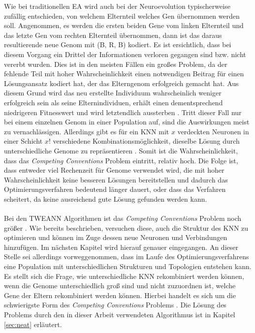 Wie bei traditionellen \ac{EA} wird auch bei der Neuroevolution typischerweise zufällig entschieden, von welchem Elternteil welches Gen übernommen werden soll. Angenommen, es werden die ersten beiden Gene vom linken Elternteil und das letzte Gen vom rechten Elternteil übernommen, dann ist das daraus resultierende neue Genom mit (B, R, B) kodiert. Es ist ersichtlich, dass bei diesem Vorgang ein Drittel der Informationen verloren gegangen sind bzw. nicht vererbt wurden. Dies ist in den meisten Fällen ein großes Problem, da der fehlende Teil mit hoher Wahrscheinlichkeit einen notwendigen Beitrag für einen Lösungsansatz kodiert hat, der das Elterngenom erfolgreich gemacht hat. Aus diesem Grund wird das neu erstellte Individuum wahrscheinlich weniger erfolgreich sein als seine Elternindividuen, erhält einen dementsprechend niedrigeren Fitnesswert und wird letztendlich aussterben \cite{stanley2002evolving}. Tritt dieser Fall nur bei einem einzelnen Genom in einer Population auf, sind die Auswirkungen meist zu vernachlässigen. Allerdings gibt es für ein \ac{KNN} mit $x$ verdeckten Neuronen in einer Schicht $x!$ verschiedene Kombinationsmöglichkeit, dieselbe Lösung durch unterschiedliche Genome zu repräsentieren \cite{stanley2002evolving}. Somit ist die Wahrscheinlichkeit, dass das \emph{Competing Conventions} Problem eintritt, relativ hoch. Die Folge ist, dass entweder viel Rechenzeit für Genome verwendet wird, die mit hoher Wahrscheinlichkeit keine besseren Lösungen bereitstellen und dadurch das Optimierungsverfahren bedeutend länger dauert, oder dass das Verfahren scheitert, da keine ausreichend gute Lösung gefunden werden kann. 
\\\\
Bei den \ac{TWEANN} Algorithmen ist das \emph{Competing Conventions} Problem noch größer \cite{stanley2002evolving}. Wie bereits beschrieben, versuchen diese, auch die Struktur des \ac{KNN} zu optimieren und können im Zuge dessen neue Neuronen und Verbindungen hinzufügen. Im nächsten Kapitel wird hierauf genauer eingegangen. An dieser Stelle sei allerdings vorweggenommen, dass im Laufe des Optimierungsverfahrens eine Population mit unterschiedlichen Strukturen und Topologien entstehen kann. Es stellt sich die Frage, wie  unterschiedliche \ac{KNN} rekombiniert werden können, wenn die Genome unterschiedlich groß sind und nicht zuzuordnen ist, welche Gene der Eltern rekombiniert werden können. Hierbei handelt es sich um die schwierigste Form des \emph{Competing Conventions} Problems \cite{stanley2002evolving}. Die Lösung des Problems durch den in dieser Arbeit verwendeten Algorithmus ist in Kapitel \ref{sec:neat} erläutert.

